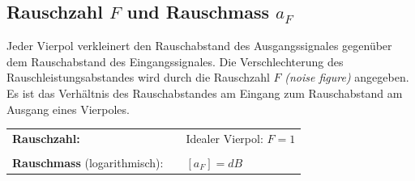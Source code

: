 	
	\subsection{Rauschzahl $F$ und Rauschmass $a_F$ }
		Jeder Vierpol verkleinert den Rauschabstand des Ausgangssignales gegenüber dem Rauschabstand des Eingangssignales.
		Die Verschlechterung des Rauschleistungsabstandes wird durch die Rauschzahl $F$ \textit{(noise figure)} angegeben.
		Es ist das Verhältnis des Rauschabstandes am Eingang zum Rauschabstand am Ausgang eines Vierpoles.\\
		
		\begin{tabular}{lll}
			\textbf{Rauschzahl:}
		&	\fbox{$F 	= \dfrac{\text{SNR}_{Eingang}}{\text{SNR}_{Ausgang}}
						= \dfrac{\frac{P_{sEingang}}{P_{rEingang}}}{\frac{P_{sAusgang}}{P_{rAusgang}}} 
						= \frac{P_{sEingang}}{P_{rEingang}} \cdot \frac{P_{rAusgang}}{P_{sAusgang}}$
			}
		&	Idealer Vierpol: $F = 1$
		\\
		&
		&
		\\
			\textbf{Rauschmass} (logarithmisch):
		&	\formel{$a_F = 10 \cdot log_{10} (F) = a_{rEingang} - a_{rAusgang}$}
		&	$[a_F] = dB$
		\end{tabular}\\
	
